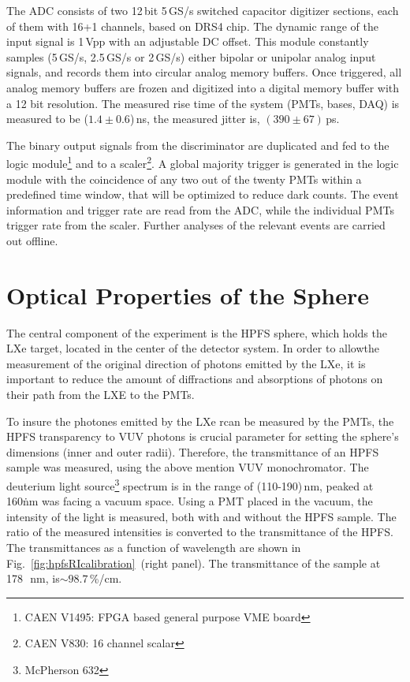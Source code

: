 The ADC consists of two 12\,bit 5\,GS/s switched capacitor digitizer sections, 
each of them with 16+1 channels, based on DRS4 chip. The dynamic range of the input signal is 1\,Vpp with an adjustable DC offset. This module constantly samples (5\,GS/s, 2.5\,GS/s or 2\,GS/s) either bipolar or unipolar analog input 
signals, and records them into circular 
analog memory buffers. Once triggered, all analog memory 
buffers are frozen and digitized into a digital memory buffer 
with a 12 bit resolution. The measured rise time of the system (PMTs, bases, DAQ) is measured to be ($1.4 \pm 0.6$)\,ns, the measured jitter is, $(390 \pm 67)$\,ps. 

The binary output signals from the discriminator are duplicated and fed to 
the logic module\footnote{CAEN V1495: FPGA based general purpose VME board} and to a scaler\footnote{CAEN V830: 16 channel scalar}. 
A global majority trigger is generated in the logic module with the coincidence of any two out of the twenty PMTs within a predefined time window, that will be optimized to reduce dark counts. The event information and trigger rate are read from the ADC, while the individual PMTs trigger rate from the scaler. Further analyses of the relevant events are carried out offline.



\section{Optical Properties of the Sphere }
\label{sec:opt}


The central component of the experiment is the HPFS sphere, which holds the LXe target, located in the center of the detector system. In order to allowthe measurement of the original direction of photons emitted by the LXe, it is important to reduce the amount of diffractions and absorptions of photons on their path from the LXE to the PMTs.   

To insure the photones emitted by the LXe rcan be measured by the PMTs, the HPFS transparency to VUV photons is crucial parameter for setting the sphere's dimensions (inner and outer radii). 
Therefore, the transmittance of an HPFS sample was measured, using the above mention VUV monochromator. The deuterium light source\footnote{McPherson 632} spectrum is in the range of (110-190)\,nm, peaked at 160\.nm was facing a vacuum space. Using a PMT placed in the vacuum, the intensity of the light is measured, both with and without the HPFS sample. The ratio of the measured intensities is converted to the transmittance of the HPFS. The transmittances as a function of wavelength are shown in Fig.~\ref{fig:hpfsRIcalibration}~(right panel). The transmittance of the sample at 178~\,nm, is$\sim98.7$\,\%/cm.  

